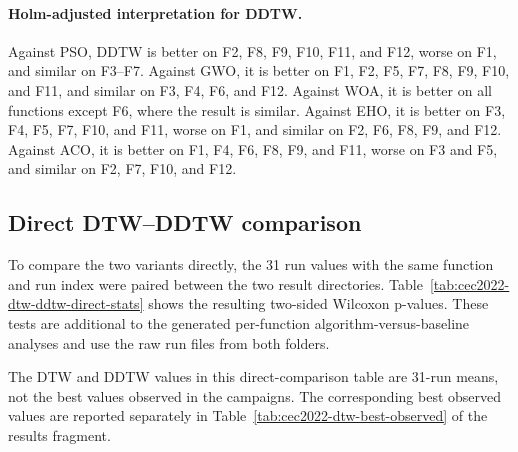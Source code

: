 \paragraph{Holm-adjusted interpretation for DDTW.}
Against PSO, DDTW is better on F2, F8, F9, F10, F11, and F12, worse on F1,
and similar on F3--F7. Against GWO, it is better on F1, F2, F5, F7, F8, F9,
F10, and F11, and similar on F3, F4, F6, and F12. Against WOA, it is better
on all functions except F6, where the result is similar. Against EHO, it is
better on F3, F4, F5, F7, F10, and F11, worse on F1, and similar on F2, F6,
F8, F9, and F12. Against ACO, it is better on F1, F4, F6, F8, F9, and F11,
worse on F3 and F5, and similar on F2, F7, F10, and F12.

\subsection{Direct DTW--DDTW comparison}

To compare the two variants directly, the 31 run values with the same function
and run index were paired between the two result directories. Table~\ref{tab:cec2022-dtw-ddtw-direct-stats}
shows the resulting two-sided Wilcoxon p-values. These tests are additional to
the generated per-function algorithm-versus-baseline analyses and use the raw
run files from both folders.

The DTW and DDTW values in this direct-comparison table are 31-run means, not
the best values observed in the campaigns. The corresponding best observed
values are reported separately in Table~\ref{tab:cec2022-dtw-best-observed} of
the results fragment.

